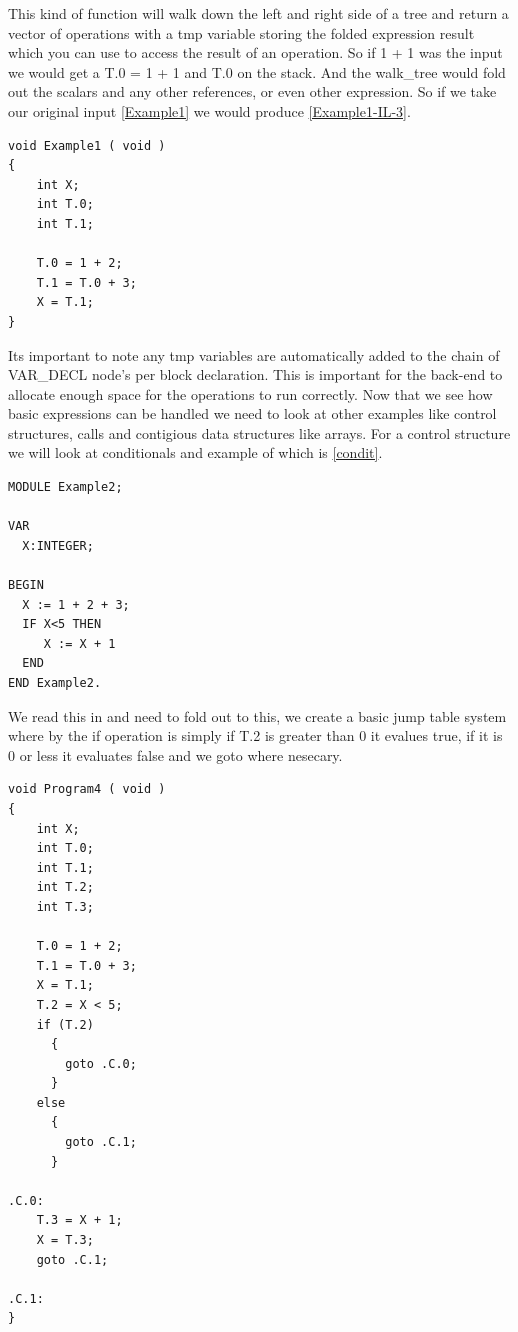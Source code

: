 \documentclass[defaultstyle,11pt]{article}
\begin{document}
This kind of function will walk down the left and right side of a tree and return a vector of operations with a tmp
variable storing the folded expression result which you can use to access the result of an operation. So if 1 + 1 was
the input we would get a T.0 = 1 + 1 and T.0 on the stack. And the walk\_tree would fold out the scalars and any other
references, or even other expression. So if we take our original input \ref{Example1} we would produce \ref{Example1-IL-3}.

\begin{lstlisting}
void Example1 ( void )
{
	int X; 
	int T.0; 
	int T.1; 

	T.0 = 1 + 2;
	T.1 = T.0 + 3;
	X = T.1;
}
\end{lstlisting}

Its important to note any tmp variables are automatically added to the chain of VAR\_DECL node's per block declaration. This
is important for the back-end to allocate enough space for the operations to run correctly. Now that we see how basic expressions
can be handled we need to look at other examples like control structures, calls and contigious data structures like arrays. For a
control structure we will look at conditionals and example of which is \ref{condit}.

\begin{lstlisting}
MODULE Example2;

VAR
  X:INTEGER;

BEGIN
  X := 1 + 2 + 3;
  IF X<5 THEN
     X := X + 1
  END
END Example2.
\end{lstlisting}

We read this in and need to fold out to this, we create a basic jump table system where by the if
operation is simply if T.2 is greater than 0 it evalues true, if it is 0 or less it evaluates false
and we goto where nesecary.

\begin{lstlisting}
void Program4 ( void )
{
	int X; 
	int T.0; 
	int T.1; 
	int T.2; 
	int T.3; 

	T.0 = 1 + 2;
	T.1 = T.0 + 3;
	X = T.1;
	T.2 = X < 5;
	if (T.2)
	  {
		goto .C.0;
	  }
	else 
	  {
		goto .C.1;
	  }
	
.C.0:
	T.3 = X + 1;
	X = T.3;
	goto .C.1;
	
.C.1:
}
\end{lstlisting}
\end{document}
